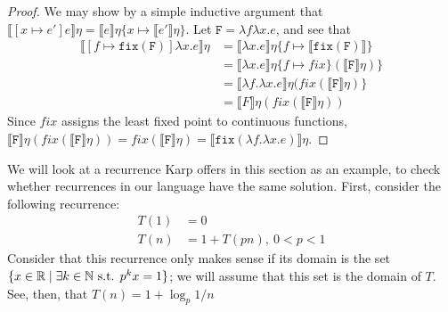 \begin{proof}
We may show by a simple inductive argument that 
$\llbracket [x \mapsto e']e\rrbracket\eta = \llbracket e \rrbracket\eta\{x \mapsto \llbracket e' \rrbracket\eta\}$.
Let $\texttt{F} = \lambda f \lambda x.e$, and see that
\begin{align*}
\llbracket [f \mapsto \texttt{fix}(\texttt{F})]\lambda x.e\rrbracket\eta 
&= \llbracket \lambda x.e\rrbracket\eta\{f \mapsto \llbracket \texttt{fix}(\texttt{F})\rrbracket\} \\
&=\llbracket \lambda x.e\rrbracket\eta\{f \mapsto fix\}(\llbracket \texttt{F} \rrbracket\eta)\} \\
&= \llbracket \lambda f.\lambda x.e \rrbracket\eta(fix(\llbracket \texttt{F}\rrbracket\eta)\} \\
&= \llbracket F \rrbracket\eta(fix(\llbracket \texttt{F}\rrbracket\eta)) 
\end{align*}
Since $fix$ assigns the least fixed point to continuous functions, 
$\llbracket \texttt{F} \rrbracket\eta(fix(\llbracket \texttt{F}\rrbracket\eta)) = fix(\llbracket \texttt{F}\rrbracket\eta) =  \llbracket \texttt{fix}(\lambda f. \lambda x.e)\rrbracket \eta$.
\end{proof}
 
We will look at a recurrence Karp offers in this section as an example, to check whether recurrences in our 
language have the same solution. First, consider the following recurrence:
\begin{align*}
T(1) &= 0 \\
T(n) &= 1 + T(pn), \ 0 < p < 1
\end{align*} 
Consider that this recurrence only makes sense if its domain is the set $\{x \in \mathbb{R} \mid \exists k \in \mathbb{N} \text{ s.t. } p^kx = 1\}$;
we will assume that this set is the domain of $T$. 
 See, then, that $T(n) = 1 +  \log_{p}1/n $

